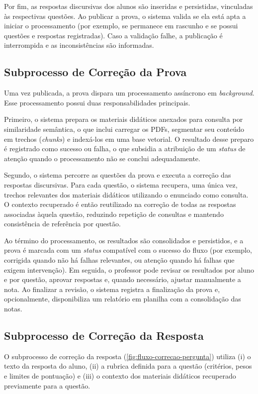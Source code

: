 Por fim, as respostas discursivas dos alunos são inseridas e persistidas, vinculadas às respectivas questões. Ao publicar a prova, o sistema valida se ela está apta a iniciar o processamento (por exemplo, se permanece em rascunho e se possui questões e respostas registradas). Caso a validação falhe, a publicação é interrompida e as inconsistências são informadas.

\subsection{Subprocesso de Correção da Prova}

Uma vez publicada, a prova dispara um processamento assíncrono em \textit{background}. Esse processamento possui duas responsabilidades principais.

Primeiro, o sistema prepara os materiais didáticos anexados para consulta por similaridade semântica, o que inclui carregar os PDFs, segmentar seu conteúdo em trechos (\textit{chunks}) e indexá-los em uma base vetorial. O resultado desse preparo é registrado como sucesso ou falha, o que subsidia a atribuição de um \textit{status} de atenção quando o processamento não se conclui adequadamente.

Segundo, o sistema percorre as questões da prova e executa a correção das respostas discursivas. Para cada questão, o sistema recupera, uma única vez, trechos relevantes dos materiais didáticos utilizando o enunciado como consulta. O contexto recuperado é então reutilizado na correção de todas as respostas associadas àquela questão, reduzindo repetição de consultas e mantendo consistência de referência por questão.

Ao término do processamento, os resultados são consolidados e persistidos, e a prova é marcada com um \textit{status} compatível com o sucesso do fluxo (por exemplo, corrigida quando não há falhas relevantes, ou atenção quando há falhas que exigem intervenção). Em seguida, o professor pode revisar os resultados por aluno e por questão, aprovar respostas e, quando necessário, ajustar manualmente a nota. Ao finalizar a revisão, o sistema registra a finalização da prova e, opcionalmente, disponibiliza um relatório em planilha com a consolidação das notas.

\subsection{Subprocesso de Correção da Resposta}

O subprocesso de correção da resposta (\autoref{fig:fluxo-correcao-pergunta}) utiliza (i) o texto da resposta do aluno, (ii) a rubrica definida para a questão (critérios, pesos e limites de pontuação) e (iii) o contexto dos materiais didáticos recuperado previamente para a questão.

